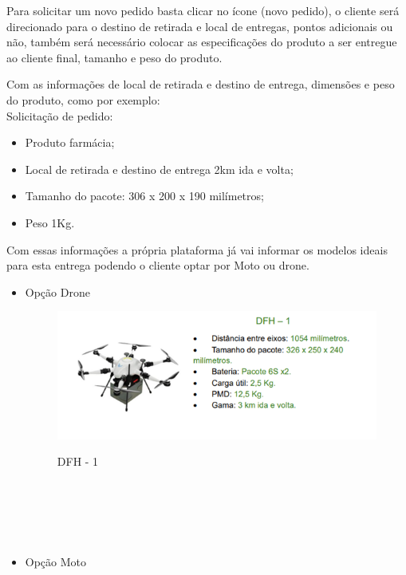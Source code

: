 Para solicitar um novo pedido basta clicar no ícone (novo pedido), o cliente será direcionado para o destino de retirada e local de entregas, pontos adicionais ou não, também será necessário colocar as especificações do produto a ser entregue ao cliente final, tamanho e peso do produto.

Com as informações de local de retirada e destino de entrega, dimensões e peso do produto, como por exemplo:\\

Solicitação de pedido:

\begin{itemize}
    \item Produto farmácia;
    \item Local de retirada e destino de entrega 2km ida e volta;
    \item Tamanho do pacote: 306 x 200 x 190 milímetros;
    \item Peso 1Kg.\\
\end{itemize}

Com essas informações a própria plataforma já vai informar os modelos ideais para esta entrega podendo o cliente optar por Moto ou drone.

\begin{itemize} 
    \item Opção Drone
    \begin{figure} [!ht]
       {\centering
        \caption{DFH - 1}
        \includegraphics[width=0.9\linewidth]{figuras/drone dfh1.png}
        \label{fig:enter-label}
        }
    \end{figure}
\\\\\\\\
    
    \item Opção Moto
    \end{itemize}


